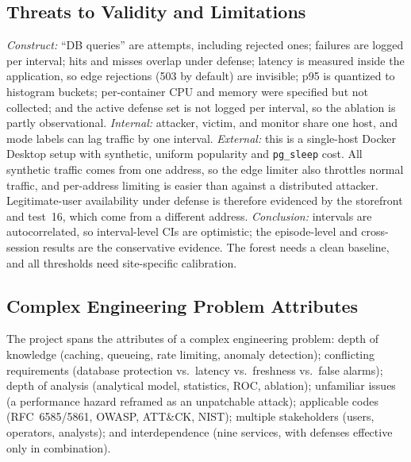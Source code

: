 \documentclass[journal]{IEEEtran}
\begin{document}
\subsection{Threats to Validity and Limitations}
\label{sec:validity}
\emph{Construct:} ``DB queries'' are attempts, including rejected ones; failures are
logged per interval; hits and misses overlap under defense; latency is measured inside
the application, so edge rejections (503 by default) are invisible; p95 is quantized to
histogram buckets; per-container CPU and memory were specified but not collected; and
the active defense set is not logged per interval, so the ablation is partly
observational. \emph{Internal:} attacker, victim, and monitor share one host, and mode
labels can lag traffic by one interval. \emph{External:} this is a single-host Docker
Desktop setup with synthetic, uniform popularity and \texttt{pg\_sleep} cost. All
synthetic traffic comes from one address, so the edge limiter also throttles normal
traffic, and per-address limiting is easier than against a distributed attacker.
Legitimate-user availability under defense is therefore evidenced by the storefront and
test~16, which come from a different address. \emph{Conclusion:} intervals are
autocorrelated, so interval-level CIs are optimistic; the episode-level and
cross-session results are the conservative evidence. The forest needs a clean baseline,
and all thresholds need site-specific calibration.

\subsection{Complex Engineering Problem Attributes}
The project spans the attributes of a complex engineering problem: depth of knowledge (caching, queueing,
rate limiting, anomaly detection); conflicting requirements (database protection vs.\
latency vs.\ freshness vs.\ false alarms); depth of analysis (analytical model,
statistics, ROC, ablation); unfamiliar issues (a performance hazard reframed as an
unpatchable attack); applicable codes (RFC~6585/5861, OWASP, ATT\&CK, NIST); multiple
stakeholders (users, operators, analysts); and interdependence (nine services, with
defenses effective only in combination).

\end{document}
